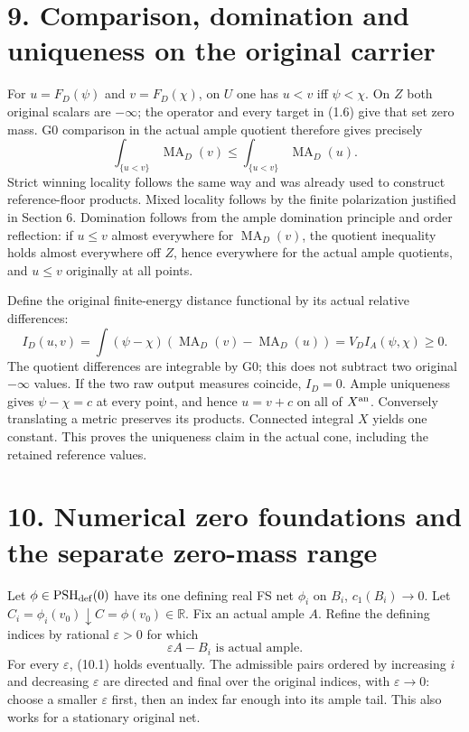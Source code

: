 \documentclass[
  10pt,
]{article}
\begin{document}
\section{9. Comparison, domination and uniqueness on the original
carrier}\label{comparison-domination-and-uniqueness-on-the-original-carrier}

For \(u=F_D(\psi)\) and \(v=F_D(\chi)\), on \(U\) one has \(u<v\) iff
\(\psi<\chi\). On \(Z\) both original scalars are \(-\infty\); the
operator and every target in (1.6) give that set zero mass. G0
comparison in the actual ample quotient therefore gives precisely
\[\int_{\{u<v\}}\operatorname{MA}_D(v)
\leq\int_{\{u<v\}}\operatorname{MA}_D(u).\tag{9.1}\] Strict winning
locality follows the same way and was already used to construct
reference-floor products. Mixed locality follows by the finite
polarization justified in Section 6. Domination follows from the ample
domination principle and order reflection: if \(u\leq v\) almost
everywhere for \(\operatorname{MA}_D(v)\), the quotient inequality holds
almost everywhere off \(Z\), hence everywhere for the actual ample
quotients, and \(u\leq v\) originally at all points.

Define the original finite-energy distance functional by its actual
relative differences: \[I_D(u,v)=\int(\psi-\chi)
\left(\operatorname{MA}_D(v)-\operatorname{MA}_D(u)\right)
=V_DI_A(\psi,\chi)\geq0.\tag{9.2}\] The quotient differences are
integrable by G0; this does not subtract two original \(-\infty\)
values. If the two raw output measures coincide, \(I_D=0\). Ample
uniqueness gives \(\psi-\chi=c\) at every point, and hence \(u=v+c\) on
all of \(X^{\rm an}\). Conversely translating a metric preserves its
products. Connected integral \(X\) yields one constant. This proves the
uniqueness claim in the actual cone, including the retained reference
values.

\section{10. Numerical zero foundations and the separate zero-mass
range}\label{numerical-zero-foundations-and-the-separate-zero-mass-range}

Let \(\phi\in\operatorname{PSH}_{\rm def}(0)\) have its one defining
real FS net \(\phi_i\) on \(B_i\), \(c_1(B_i)\to0\). Let
\(C_i=\phi_i(v_0)\downarrow C=\phi(v_0)\in\mathbb R\). Fix an actual
ample \(A\). Refine the defining indices by rational \(\varepsilon>0\)
for which \[\varepsilon A-B_i\text{ is actual ample}.\tag{10.1}\] For
every \(\varepsilon\), (10.1) holds eventually. The admissible pairs
ordered by increasing \(i\) and decreasing \(\varepsilon\) are directed
and final over the original indices, with \(\varepsilon\to0\): choose a
smaller \(\varepsilon\) first, then an index far enough into its ample
tail. This also works for a stationary original net.
\end{document}
